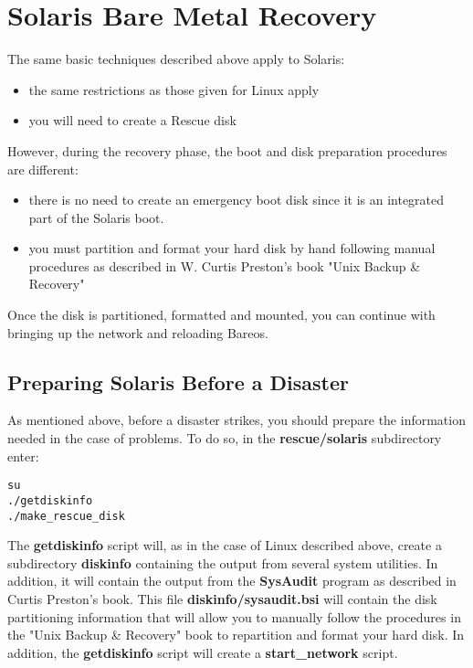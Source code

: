 \label{solaris}
\section{Solaris Bare Metal Recovery}

The same basic techniques described above apply to Solaris:

\begin{itemize}
\item the same restrictions as those given for Linux apply
\item you will need to create a Rescue disk
   \end{itemize}

However, during the recovery phase, the boot and disk preparation procedures
are different:

\begin{itemize}
\item there is no need to create an emergency boot disk  since it is an
   integrated part of the Solaris boot.
\item you must partition and format your hard disk by hand  following manual
   procedures as described in W. Curtis Preston's  book "Unix Backup \&
   Recovery"
\end{itemize}

Once the disk is partitioned, formatted and mounted, you can continue with
bringing up the network and reloading Bareos.

\subsection{Preparing Solaris Before a Disaster}

As mentioned above, before a disaster strikes, you should prepare the
information needed in the case of problems. To do so, in the {\bf
rescue/solaris} subdirectory enter:

\footnotesize
\begin{verbatim}
su
./getdiskinfo
./make_rescue_disk
\end{verbatim}
\normalsize

The {\bf getdiskinfo} script will, as in the case of Linux described above,
create a subdirectory {\bf diskinfo} containing the output from several system
utilities. In addition, it will contain the output from the {\bf SysAudit}
program as described in Curtis Preston's book. This file {\bf
diskinfo/sysaudit.bsi} will contain the disk partitioning information that
will allow you to manually follow the procedures in the "Unix Backup \&
Recovery" book to repartition and format your hard disk. In addition, the
{\bf getdiskinfo} script will create a {\bf start\_network} script.

